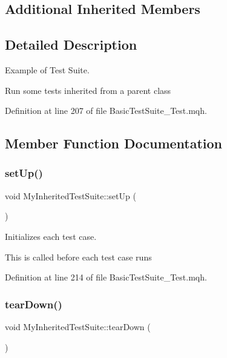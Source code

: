 \subsection*{Additional Inherited Members}


\subsection{Detailed Description}
Example of Test Suite. 

Run some tests inherited from a parent class 

Definition at line 207 of file Basic\+Test\+Suite\+\_\+\+Test.\+mqh.



\subsection{Member Function Documentation}
\mbox{\label{class_my_inherited_test_suite_a3aa9d1d4ab762d55cfee1d2f6298c3f9}} 
\subsubsection{\texorpdfstring{set\+Up()}{setUp()}}
{\footnotesize\ttfamily void My\+Inherited\+Test\+Suite\+::set\+Up (\begin{DoxyParamCaption}{ }\end{DoxyParamCaption})\hspace{0.3cm}{\ttfamily [inline]}}



Initializes each test case. 

This is called before each test case runs 

Definition at line 214 of file Basic\+Test\+Suite\+\_\+\+Test.\+mqh.

\mbox{\label{class_my_inherited_test_suite_abbd94d1b4868f8252b001ce743eeb691}} 
\subsubsection{\texorpdfstring{tear\+Down()}{tearDown()}}
{\footnotesize\ttfamily void My\+Inherited\+Test\+Suite\+::tear\+Down (\begin{DoxyParamCaption}{ }\end{DoxyParamCaption})\hspace{0.3cm}{\ttfamily [inline]}}



